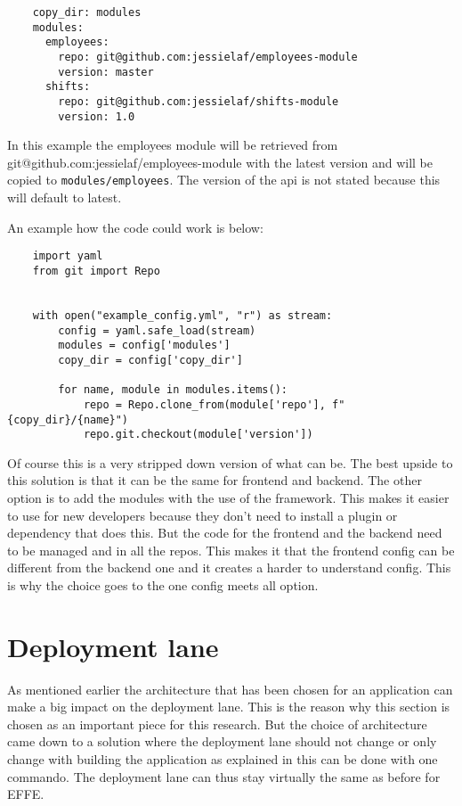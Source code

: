 \begin{verbatim}
    copy_dir: modules
    modules:
      employees:
        repo: git@github.com:jessielaf/employees-module
        version: master
      shifts:
        repo: git@github.com:jessielaf/shifts-module
        version: 1.0
\end{verbatim}

In this example the employees module will be retrieved from git@github.com:jessielaf/employees-module with the latest version and will be copied to \texttt{modules/employees}. The version of the api is not stated because this will default to latest.

An example how the code could work is below:
\begin{verbatim}
    import yaml
    from git import Repo


    with open("example_config.yml", "r") as stream:
        config = yaml.safe_load(stream)
        modules = config['modules']
        copy_dir = config['copy_dir']

        for name, module in modules.items():
            repo = Repo.clone_from(module['repo'], f"{copy_dir}/{name}")
            repo.git.checkout(module['version'])
\end{verbatim}

Of course this is a very stripped down version of what can be. The best upside to this solution is that it can be the same for frontend and backend. The other option is to add the modules with the use of the framework. This makes it easier to use for new developers because they don't need to install a plugin or dependency that does this. But the code for the frontend and the backend need to be managed and in all the repos. This makes it that the frontend config can be different from the backend one and it creates a harder to understand config. This is why the choice goes to the one config meets all option.

\section{Deployment lane}

As mentioned earlier the architecture that has been chosen for an application can make a big impact on the deployment lane. This is the reason why this section is chosen as an important piece for this research. But the choice of architecture came down to a solution where the deployment lane should not change or only change with building the application as explained in  this can be done with one commando. The deployment lane can thus stay virtually the same as before for EFFE.

